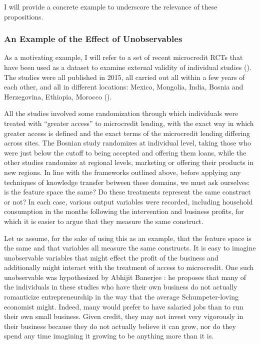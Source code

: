 \documentclass[a4paper,12pt]{article}
\begin{document}
I will provide a concrete example to underscore the relevance of these propositions.

\subsubsection{An Example of the Effect of Unobservables} \label{unobservables}

As a motivating example, I will refer to a set of recent microcredit RCTs that have been used as a dataset to examine external validity of individual studies (\cite{Pritchett2016, Meager2018}). The studies were all published in 2015, all carried out all within a few years of each other, and all in different locations: Mexico, Mongolia, India, Bosnia and Herzegovina, Ethiopia, Morocco (\cite{Attanasio2015, Angelucci2015, Augsburg2015, Banerjee2015, Crepon2015, Tarozzi2015}).

All the studies involved some randomization through which individuals were treated with ``greater access'' to microcredit lending, with the exact way in which greater access is defined and the exact terms of the microcredit lending differing across sites. The Bosnian study randomizes at individual level, taking those who were just below the cutoff to being accepted and offering them loans, while the other studies randomize at regional levels, marketing or offering their products in new regions. In line with the frameworks outlined above, before applying any techniques of knowledge transfer between these domains, we must ask ourselves: is the feature space the same? Do these treatments represent the same construct or not? In each case, various output variables were recorded, including household consumption in the months following the intervention and business profits, for which it is easier to argue that they measure the same construct.

Let us assume, for the sake of using this as an example, that the feature space is the same and that variables all measure the same constructs. It is easy to imagine unobservable variables that might effect the profit of the business and additionally might interact with the treatment of access to microcredit. One such unobservable was hypothesized by Abhijit Banerjee \parencite*{Banerjee2011}: he proposes that many of the individuals in these studies who have their own business do not actually romanticize entrepreneurship in the way that the average Schumpeter-loving economist might. Indeed, many would prefer to have salaried jobs than to run their own small business. Given credit, they may not invest very vigorously in their business because they do not actually believe it can grow, nor do they spend any time imagining it growing to be anything more than it is.
\end{document}
